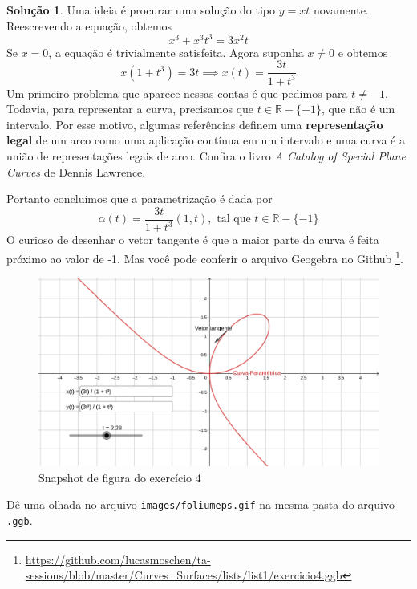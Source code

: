 \documentclass[a4paper,12pt]{article}
\newcommand{\R}{\mathbb{R}}
\theoremstyle{exer}
\theoremstyle{definition}
\newtheorem{solution}{Solução}
\theoremstyle{plain}
\begin{document}
\begin{solution}
    Uma ideia é procurar uma solução do tipo $y = xt$ novamente. Reescrevendo
    a equação, obtemos
    $$
    x^3 + x^3t^3 = 3x^2t
    $$
    Se $x=0$, a equação é trivialmente satisfeita. Agora suponha $x \neq 0$ e
    obtemos 
    $$
    x(1 + t^3) = 3t \implies x(t) = \frac{3t}{1 + t^3}
    $$
    Um primeiro problema que aparece nessas contas é que pedimos para $t \neq
    -1$. Todavia, para representar a curva, precisamos que $t \in \R-\{-1\}$,
    que não é um intervalo. Por esse motivo, algumas referências definem uma
    {\bf representação legal} de um arco como uma aplicação contínua em um intervalo e uma curva é a
    união de representações legais de arco. Confira o livro {\it A Catalog of
    Special Plane Curves} de Dennis Lawrence. 
    
    Portanto concluímos que a parametrização é dada por 
    $$
    \alpha(t) = \frac{3t}{1 + t^3}(1, t), \text{ tal que } t \in \R - \{-1\}
    $$
    O curioso de desenhar o vetor tangente é que a maior parte da curva é
    feita próximo ao valor de -1. Mas você pode conferir o arquivo Geogebra no
    Github \footnote{\url{https://github.com/lucasmoschen/ta-sessions/blob/master/Curves_Surfaces/lists/list1/exercicio4.ggb}}.

    \begin{figure}[ht]
        \centering
        \includegraphics[width=\textwidth]{images/exe4.png}
        \caption{Snapshot de figura do exercício 4}
        \label{fig-exe4}
    \end{figure}
    
    Dê uma olhada no arquivo \texttt{images/foliumeps.gif} na mesma pasta do
    arquivo {\tt .ggb}. 

\end{solution}
\end{document}
